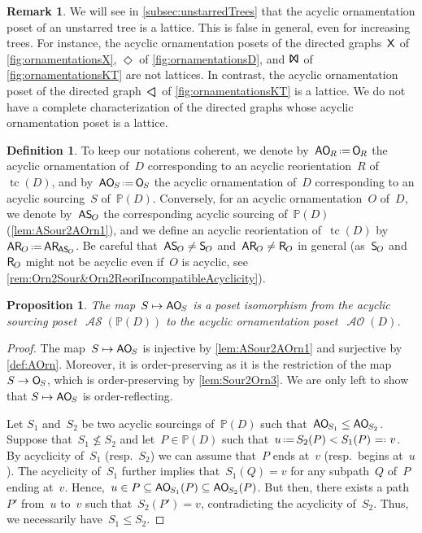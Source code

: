 \documentclass{amsart}
\newtheorem{proposition}[theorem]{Proposition}
\theoremstyle{definition}
\newtheorem{definition}[theorem]{Definition}
\newtheorem{remark}[theorem]{Remark}
\renewcommand{\c}[1]{\mathcal{#1}} %
\newcommand{\eqdef}{\mbox{\,\raisebox{0.2ex}{\scriptsize\ensuremath{\mathrm:}}\ensuremath{=}\,}} %
\newcommand{\defeq}{\mbox{~\ensuremath{=}\raisebox{0.2ex}{\scriptsize\ensuremath{\mathrm:}} }} %
\DeclareMathOperator{\tc}{tc} %
\newcommand{\mymap}[2]{\mathsf{#1}_{\hspace{-.7pt}#2}}
\newcommand{\orn}[1]{\mymap{O}{#1}}  %
\DeclareMathOperator{\AOrn}{\c{AO}}  %
\newcommand{\aorn}[1]{\mymap{AO}{#1}}  %
\newcommand{\reori}[1]{\mymap{R}{#1}}  %
\newcommand{\areori}[1]{\mymap{AR}{#1}}  %
\newcommand{\sour}[1]{\mymap{S}{#1}}  %
\DeclareMathOperator{\ASour}{\mathcal{AS}}  %
\newcommand{\asour}[1]{\mymap{AS}{#1}}  %
\newcommand{\PP}{\mathbb P} %
\newcommand{\Xgraph}{\sf X} %
\newcommand{\Tgraph}{\sf I\!X\!I} %
\newcommand{\Dgraph}{\boldsymbol{\Diamond}} %
\newcommand{\Kgraph}{\rotatebox[origin=c]{90}{$\boldsymbol{\triangle}$}} %
\begin{document}
\begin{remark}
\label{rem:AOrnLat}
We will see in \cref{subsec:unstarredTrees} that the acyclic ornamentation poset of an unstarred tree  is a lattice.
This is false in general, even for increasing trees.
For instance, the acyclic ornamentation posets of the directed graphs~$\Xgraph$ of \cref{fig:ornamentationsX}, $\Dgraph$ of \cref{fig:ornamentationsD}, and $\Tgraph$ of \cref{fig:ornamentationsKT} are not lattices.
In contrast, the acyclic ornamentation poset of the directed graph~$\Kgraph$ of \cref{fig:ornamentationsKT} is a lattice.
We do not have a complete characterization of the directed graphs whose acyclic ornamentation poset is a lattice.
\end{remark}

\begin{definition}
\label{def:moreNotations}
To keep our notations coherent, we denote by~$\aorn{R} \eqdef \orn{R}$ the acyclic ornamentation of~$D$ corresponding to an acyclic reorientation~$R$ of~$\tc(D)$, and by~$\aorn{S} \eqdef \orn{S}$ the acyclic ornamentation of~$D$ corresponding to an acyclic sourcing~$S$ of~$\PP(D)$.
Conversely, for an acyclic ornamentation~$O$ of~$D$, we denote by~$\asour{O}$ the corresponding acyclic sourcing of~$\PP(D)$ (\cref{lem:ASour2AOrn1}), and we define an acyclic reorientation of~$\tc(D)$ by~$\areori{O} \eqdef \areori{\asour{O}}$.
Be careful that~$\asour{O} \ne \sour{O}$ and~$\areori{O} \ne \reori{O}$ in general (as~$\sour{O}$ and~$\reori{O}$ might not be acyclic even if~$O$ is acyclic, see \cref{rem:Orn2Sour&Orn2ReoriIncompatibleAcyclicity}).
\end{definition}

\begin{proposition}
\label{prop:ASour2AOrn}
The map~$S \mapsto \aorn{S}$ is a poset isomorphism from the acyclic sourcing \linebreak poset~$\ASour(\PP(D))$ to the acyclic ornamentation poset~$\AOrn(D)$.
\end{proposition}

\begin{proof}
The map~$S \mapsto \aorn{S}$ is injective by \cref{lem:ASour2AOrn1} and surjective by \cref{def:AOrn}.
Moreover, it is order-preserving as it is the restriction of the map $S \to \orn{S}$, which is order-preserving by \cref{lem:Sour2Orn3}.
We are only left to show that $S \mapsto \aorn{S}$ is order-reflecting.

Let $S_1$ and~$S_2$ be two acyclic sourcings of~$\PP(D)$ such that~$\aorn{S_1} \leq \aorn{S_2}$.
Suppose that~$S_1 \not\leq S_2$ and let~$P \in \PP(D)$ such that~$u \eqdef S_2(P) < S_1(P) \defeq v$.
By acyclicity of~$S_1$ (resp.~$S_2$) we can assume that~$P$ ends at~$v$ (resp.~begins at~$u$).
The acyclicity of~$S_1$ further implies that~$S_1(Q) = v$ for any subpath~$Q$ of~$P$ ending at~$v$.
Hence,~$u \in P \subseteq \aorn{S_1}(P) \subseteq \aorn{S_2}(P)$.
But then, there exists a path~$P'$ from~$u$ to~$v$ such that~$S_2(P') = v$, contradicting the acyclicity of~$S_2$.
Thus, we necessarily have~$S_1 \leq S_2$.
\end{proof}
\end{document}
